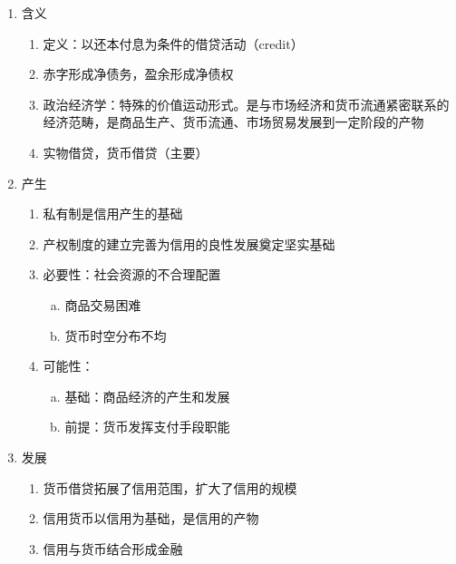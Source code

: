 \documentclass[12pt]{book}
\begin{document}
\begin{enumerate}[1.]
    \item 含义
          \begin{enumerate}[(1)]
              \item 定义：以还本付息为条件的借贷活动（credit）
              \item 赤字形成净债务，盈余形成净债权
              \item 政治经济学：特殊的价值运动形式。是与市场经济和货币流通紧密联系的经济范畴，是商品生产、货币流通、市场贸易发展到一定阶段的产物
              \item 实物借贷，货币借贷（主要）
          \end{enumerate}
    \item 产生
          \begin{enumerate}[(1)]
              \item 私有制是信用产生的基础
              \item 产权制度的建立完善为信用的良性发展奠定坚实基础
              \item 必要性：社会资源的不合理配置
                    \begin{enumerate}[a.]
                        \item 商品交易困难
                        \item 货币时空分布不均
                    \end{enumerate}
              \item 可能性：
                    \begin{enumerate}[a.]
                        \item 基础：商品经济的产生和发展
                        \item 前提：货币发挥支付手段职能
                    \end{enumerate}
          \end{enumerate}
    \item 发展
          \begin{enumerate}[(1)]
              \item 货币借贷拓展了信用范围，扩大了信用的规模
              \item 信用货币以信用为基础，是信用的产物
              \item 信用与货币结合形成金融
          \end{enumerate}
\end{enumerate}
\end{document}
